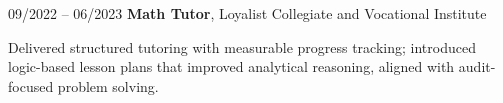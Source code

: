 \begin{twocolentry}{09/2022 – 06/2023}
    \textbf{Math Tutor}, Loyalist Collegiate and Vocational Institute
\end{twocolentry}
\begin{onecolentry}
\begin{highlights}
    \item Delivered structured tutoring with measurable progress tracking; introduced logic-based lesson plans that improved analytical reasoning, aligned with audit-focused problem solving.
\end{highlights}
\end{onecolentry}

